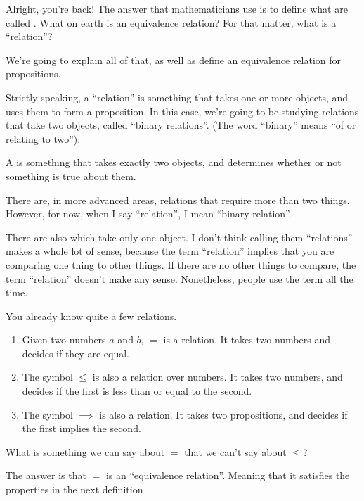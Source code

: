 \newpage

Alright, you're back! The answer that mathematicians use is to define
what are called . What on earth is an
equivalence relation? For that matter, what is a ``relation''?

We're going to explain all of that, as well as define an equivalence
relation for propositions.

Strictly speaking, a ``relation'' is something that takes one or more
objects, and uses them to form a proposition. In this case, we're
going to be studying relations that take two objects, called ``binary
relations''. (The word ``binary'' means ``of or relating to two'').

\begin{definition}
  A  is something that takes exactly two
  objects, and determines whether or not something is true about them.
\end{definition}

There are, in more advanced areas, relations that require more than
two things. However, for now, when I say ``relation'', I mean
``binary relation''.

\begin{aside}
  There are also  which take only one object. I
  don't think calling them ``relations'' makes a whole lot of sense,
  because the term ``relation'' implies that you are comparing one
  thing  to other things. If there are no other things
  to compare, the term ``relation'' doesn't make any
  sense. Nonetheless, people use the term all the time.
\end{aside}

You already know quite a few relations.

\begin{enumerate}
\item Given two numbers $a$ and $b$, $=$ is a relation. It takes two
  numbers and decides if they are equal.
\item The symbol $\le$ is also a relation over numbers. It takes two
  numbers, and decides if the first is less than or equal to the
  second.
\item The symbol $\implies$ is also a relation. It takes two
  propositions, and decides if the first implies the second.
\end{enumerate}

What is something we can say about $=$ that we can't say about $\le$?

The answer is that $=$ is an ``equivalence relation''. Meaning that it
satisfies the properties in the next definition

